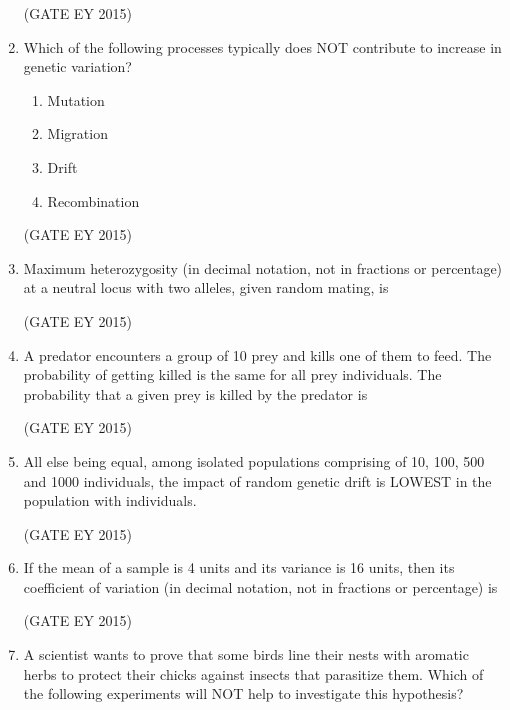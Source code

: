 \documentclass[journal,12pt,onecolumn]{IEEEtran}
\theoremstyle{remark}
\begin{document}
\begin{enumerate}
\hfill{(GATE EY 2015)}
\item 
Which of the following processes typically does NOT contribute to increase in genetic variation?

\begin{multicols}{4}
\begin{enumerate}
    
\item Mutation
\item Migration
\item Drift
\item Recombination

    \end{enumerate}
    \end{multicols}
\hfill{(GATE EY 2015)}
\item 
Maximum heterozygosity (in decimal notation, not in fractions or percentage) at a neutral locus with two alleles, given random mating, is 
\underline{\hspace{1.5cm}}


    
\hfill{(GATE EY 2015)}
\item 
A predator encounters a group of 10 prey and kills one of them to feed. The probability of getting killed is the same for all prey individuals. The probability that a given prey is killed by the predator is \underline{\hspace{1.5cm}}

\hfill{(GATE EY 2015)}
\item 
All else being equal, among isolated populations comprising of 10, 100, 500 and 1000 individuals, the impact of random genetic drift is LOWEST in the population with\underline{\hspace{1.5cm}} individuals.



\hfill{(GATE EY 2015)}
\item If the mean of a sample is 4 units and its variance is 16 units, then its coefficient of variation (in decimal notation, not in fractions or percentage) is \underline{\hspace{1.5cm}}


\hfill{(GATE EY 2015)}
\item 
A scientist wants to prove that some birds line their nests with aromatic herbs to protect their chicks against insects that parasitize them. Which of the following experiments will NOT help to investigate this hypothesis?


\begin{enumerate}
    

\end{enumerate}
\end{enumerate}
\end{document}
